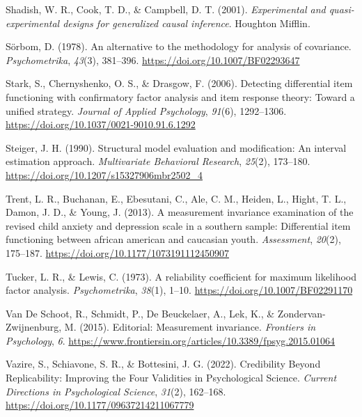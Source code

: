 \documentclass[
  man]{apa7}
\newlength{\cslhangindent}
\newlength{\cslentryspacingunit} %
\newenvironment{CSLReferences}[2] %
 {%
  \setlength{\parindent}{0pt}
  \ifodd #1
  \let\oldpar\par
  \def\par{\hangindent=\cslhangindent\oldpar}
  \fi
  \setlength{\parskip}{#2\cslentryspacingunit}
 }%
 {}
\begin{document}
\begin{CSLReferences}{1}{0}
\leavevmode{}%
Shadish, W. R., Cook, T. D., \& Campbell, D. T. (2001). \emph{Experimental and quasi-experimental designs for generalized causal inference}. Houghton Mifflin.

\leavevmode{}%
Sörbom, D. (1978). An alternative to the methodology for analysis of covariance. \emph{Psychometrika}, \emph{43}(3), 381--396. \url{https://doi.org/10.1007/BF02293647}

\leavevmode{}%
Stark, S., Chernyshenko, O. S., \& Drasgow, F. (2006). Detecting differential item functioning with confirmatory factor analysis and item response theory: Toward a unified strategy. \emph{Journal of Applied Psychology}, \emph{91}(6), 1292--1306. \url{https://doi.org/10.1037/0021-9010.91.6.1292}

\leavevmode{}%
Steiger, J. H. (1990). Structural model evaluation and modification: An interval estimation approach. \emph{Multivariate Behavioral Research}, \emph{25}(2), 173--180. \url{https://doi.org/10.1207/s15327906mbr2502_4}

\leavevmode{}%
Trent, L. R., Buchanan, E., Ebesutani, C., Ale, C. M., Heiden, L., Hight, T. L., Damon, J. D., \& Young, J. (2013). A measurement invariance examination of the revised child anxiety and depression scale in a southern sample: Differential item functioning between african american and caucasian youth. \emph{Assessment}, \emph{20}(2), 175--187. \url{https://doi.org/10.1177/1073191112450907}

\leavevmode{}%
Tucker, L. R., \& Lewis, C. (1973). A reliability coefficient for maximum likelihood factor analysis. \emph{Psychometrika}, \emph{38}(1), 1--10. \url{https://doi.org/10.1007/BF02291170}

\leavevmode{}%
Van De Schoot, R., Schmidt, P., De Beuckelaer, A., Lek, K., \& Zondervan-Zwijnenburg, M. (2015). Editorial: Measurement invariance. \emph{Frontiers in Psychology}, \emph{6}. \url{https://www.frontiersin.org/articles/10.3389/fpsyg.2015.01064}

\leavevmode{}%
Vazire, S., Schiavone, S. R., \& Bottesini, J. G. (2022). Credibility Beyond Replicability: Improving the Four Validities in Psychological Science. \emph{Current Directions in Psychological Science}, \emph{31}(2), 162--168. \url{https://doi.org/10.1177/09637214211067779}


\end{CSLReferences}
\end{document}
